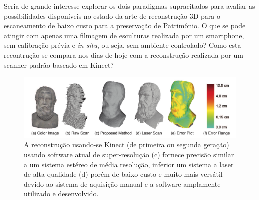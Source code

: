 Seria de grande interesse explorar os dois paradigmas supracitados
para avaliar as possibilidades disponíveis no estado da arte de reconstrução 3D
para o escaneamento de baixo custo para a preservação de Patrimônio. O que se
pode atingir com apenas uma filmagem de esculturas realizada por um smartphone,
sem calibração prévia e \emph{in situ}, ou seja, sem ambiente controlado?  Como
esta recontrução se compara nos dias de hoje com a reconstrução realizada por um
scanner padrão baseado em Kinect?

\begin{figure}[!h]
	\centering
	\includegraphics[width=1\linewidth]{figs/kinect-vs-usual.png}
	\caption{%
    A reconstrução usando-se Kinect (de primeira ou segunda geração) usando
    software atual de super-resolução (c) fornece precisão similar a um sistema estéreo de média
    resolução, inferior um sistema a laser de alta qualidade (d) porém de baixo custo e
    muito mais versátil devido ao sistema de aquisição manual e a software
    amplamente utilizado e
    desenvolvido\cite{Cui:Theobalt:etal:PAMI2013,Pajdla:etal:ICCV2011}.
	}\label{fig:rec3d:comparacao}
\end{figure}

